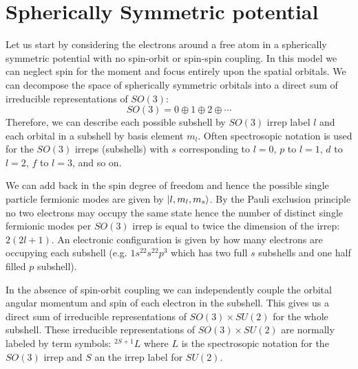 \documentclass{article}
\begin{document}
\section{Spherically Symmetric potential}
Let us start by considering the electrons around a free atom in a spherically symmetric potential with no spin-orbit or spin-spin coupling. In this model we can neglect spin for the moment and focus entirely upon the spatial orbitals. We can decompose the space of spherically symmetric orbitals into a direct sum of irreducible representations of $SO(3)$:
\begin{equation}
    SO(3) = 0 \oplus 1 \oplus 2 \oplus \cdots
\end{equation}
Therefore, we can describe each possible subshell by $SO(3)$ irrep label $l$ and each orbital in a subshell by basis element $m_l$. Often spectrosopic notation is used for the $SO(3)$ irreps (subshells) with $s$ corresponding to $l=0$, $p$ to $l=1$, $d$ to $l=2$, $f$ to $l=3$, and so on. 

We can add back in the spin degree of freedom and hence the possible single particle fermionic modes are given by $\ket{l,m_l,m_s}$. By the Pauli exclusion principle no two electrons may occupy the same state hence the number of distinct single fermionic modes per $SO(3)$ irrep is equal to twice the dimension of the irrep: $2(2l+1)$. An electronic configuration is given by how many electrons are occupying each subshell (e.g. $1s^22s^22p^3$ which has two full $s$ subshells and one half filled $p$ subshell).

In the absence of spin-orbit coupling we can independently couple the orbital angular momentum and spin of each electron in the subshell. This gives us a direct sum of irreducible representations of $SO(3)\times SU(2)$ for the whole subshell. These irreducible representations of $SO(3)\times SU(2)$ are normally labeled by term symbols: $^{2S+1}L$ where $L$ is the spectrosopic notation for the $SO(3)$ irrep and $S$ an the irrep label for $SU(2)$. 
\end{document}
